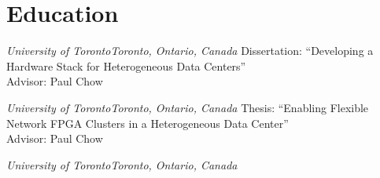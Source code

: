 \section{\sc Education}

{\textit{University of Toronto}}{\textit{Toronto, Ontario, Canada}}
{
  Dissertation: ``Developing a Hardware Stack for Heterogeneous Data Centers''
  \\Advisor:  Paul Chow
}

{\textit{University of Toronto}}{\textit{Toronto, Ontario, Canada}}
{
  Thesis: ``Enabling Flexible Network FPGA Clusters in a Heterogeneous Data Center''
  \\Advisor:  Paul Chow
}

{\textit{University of Toronto}}{\textit{Toronto, Ontario, Canada}}
{
}
